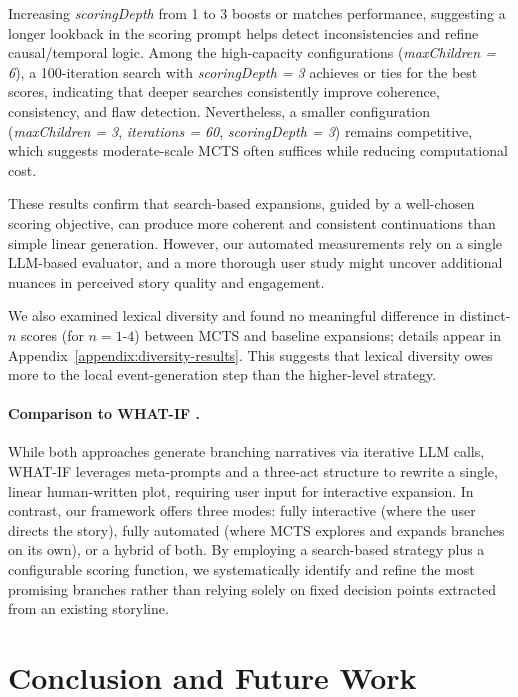 \documentclass[11pt]{article}
\begin{document}
Increasing \textit{scoringDepth} from 1 to 3 boosts or matches performance, suggesting a longer lookback in the scoring prompt helps detect inconsistencies and refine causal/temporal logic. Among the high-capacity configurations (\textit{maxChildren = 6}), a 100-iteration search with \textit{scoringDepth = 3} achieves or ties for the best scores, indicating that deeper searches consistently improve coherence, consistency, and flaw detection. Nevertheless, a smaller configuration (\textit{maxChildren = 3}, \textit{iterations = 60}, \textit{scoringDepth = 3}) remains competitive, which suggests moderate-scale MCTS often suffices while reducing computational cost.

These results confirm that search-based expansions, guided by a well-chosen scoring objective, can produce more coherent and consistent continuations than simple linear generation. However, our automated measurements rely on a single LLM-based evaluator, and a more thorough user study might uncover additional nuances in perceived story quality and engagement.

We also examined lexical diversity and found no meaningful difference in distinct-$n$ scores (for $n=1\text{-}4$) between MCTS and baseline expansions; details appear in Appendix~\ref{appendix:diversity-results}. This suggests that lexical diversity owes more to the local event-generation step than the higher-level strategy.

\paragraph{Comparison to WHAT-IF \cite{huang2024whatifexploringbranchingnarratives}.}
While both approaches generate branching narratives via iterative LLM calls, WHAT-IF leverages meta-prompts and a three-act structure to rewrite a single, linear human-written plot, requiring user input for interactive expansion. In contrast, our framework offers three modes: fully interactive (where the user directs the story), fully automated (where MCTS explores and expands branches on its own), or a hybrid of both. By employing a search-based strategy plus a configurable scoring function, we systematically identify and refine the most promising branches rather than relying solely on fixed decision points extracted from an existing storyline.

\section{Conclusion and Future Work}\label{sec:conclusion} 
\end{document}

